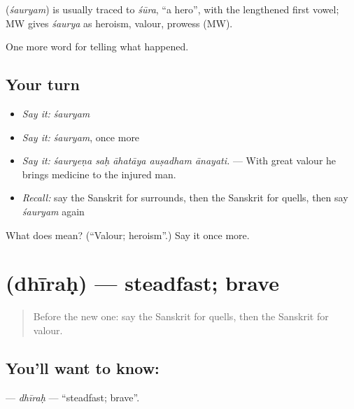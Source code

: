 \begin{cousinweb}
\textbf{} (\emph{śauryam}) is usually traced to \emph{śūra}, \textquotedblleft{}a hero\textquotedblright{}, with the lengthened first vowel; MW gives \emph{śaurya} as heroism, valour, prowess (MW).
\end{cousinweb}

\begin{grammarlens}[title={What you've built}]
One more word for telling what happened.
\end{grammarlens}

\subsection*{Your turn}
\begin{itemize}
\raggedright
  \item \emph{Say it:} \emph{śauryam}
  \item \emph{Say it:} \emph{śauryam}, once more
  \item \emph{Say it:} \emph{śauryeṇa saḥ āhatāya auṣadham ānayati.} — With great valour he brings medicine to the injured man.
  \item \emph{Recall:} say the Sanskrit for surrounds, then the Sanskrit for quells, then say \emph{śauryam} again
\end{itemize}

\begin{tcolorbox}[breakable,colback=teal!4,colframe=teal!35!black,title={Before you move on}]
What does  mean? (\textquotedblleft{}Valour; heroism\textquotedblright{}.) Say it once more.
\end{tcolorbox}
\section[\texorpdfstring{\sk{धीरः} (dhīraḥ)}{धीरः (dhīraḥ)}]{ (dhīraḥ) — steadfast; brave}

\label{lesson:SA-C314-dhirah}



\begin{quote}
Before the new one: say the Sanskrit for quells, then the Sanskrit for valour.
\end{quote}

\subsection*{You'll want to know: }
\textbf{} — \emph{dhīraḥ} — \textquotedblleft{}steadfast; brave\textquotedblright{}.


